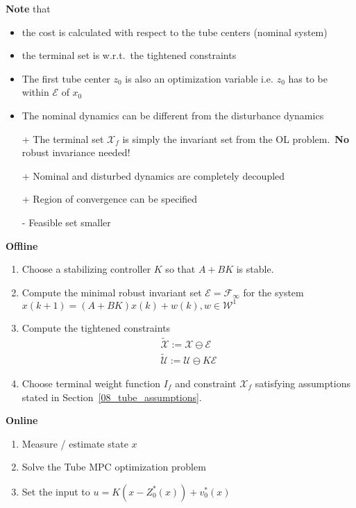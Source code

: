 \textbf{Note} that
\begin{itemize}
    \item the cost is calculated with respect to the tube centers (nominal system)
    \item the terminal set is w.r.t.\ the tightened constraints
    \item The first tube center $z_0$ is also an optimization variable i.e. $z_0$ has to be within $\mathcal{E}$ of $x_0$
    \item The nominal dynamics can be different from the disturbance dynamics
\end{itemize}

\newpar{}

\begin{itemize}
    \item [+] The terminal set $\mathcal{X}_f$ is simply the invariant set from the OL problem.~\textbf{No} robust invariance needed!
    \item [+] Nominal and disturbed dynamics are completely decoupled
    \item [+] Region of convergence can be specified        %
    \item [-] Feasible set smaller  %
\end{itemize}

\newpar{}

\textbf{Offline}
\begin{enumerate}
    \item Choose a stabilizing controller $K$ so that $A + BK$ is stable.
    \item Compute the minimal robust invariant set $\mathcal{E} = \mathcal{F}_\infty$ for the system $x(k+1) = (A + BK )x(k) + w(k), w \in \mathcal{W}^1$
    \item Compute the tightened constraints \begin{gather*}
              \tilde{\mathcal{X}}:=\mathcal{X} \ominus \mathcal{E} \\
              \tilde{\mathcal{U}}:=\mathcal{U} \ominus K\mathcal{E}
          \end{gather*}
    \item Choose terminal weight function $I_f$ and constraint $\mathcal{X}_f$ satisfying assumptions stated in Section~\ref{08_tube_assumptions}.
\end{enumerate}

\textbf{Online}
\begin{enumerate}
    \item Measure / estimate state $x$
    \item Solve the Tube MPC optimization problem
    \item Set the input to $u = K(x-Z_0^*(x))+v_0^*(x)$
\end{enumerate}

